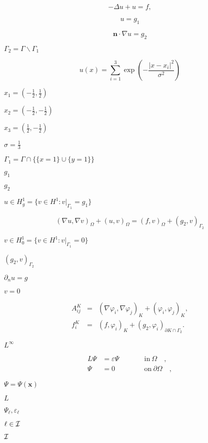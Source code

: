 \documentclass{article}
\begin{document}
\[ -\Delta u + u = f, \]
\pagebreak

\[ u = g_1 \]
\pagebreak

\[ {\mathbf n}\cdot \nabla u = g_2 \]
\pagebreak

$\Gamma_2 = \Gamma \backslash \Gamma_1$
\pagebreak

\[ u(x) = \sum_{i=1}^3 \exp\left(-\frac{|x-x_i|^2}{\sigma^2}\right) \]
\pagebreak

$x_1=(-\frac 12,\frac 12)$
\pagebreak

$x_2=(-\frac 12,-\frac 12)$
\pagebreak

$x_3=(\frac 12,-\frac 12)$
\pagebreak

$\sigma=\frac 13$
\pagebreak

$\Gamma_1=\Gamma \cap\{\{x=1\} \cup \{y=1\}\}$
\pagebreak

$g_1$
\pagebreak

$g_2$
\pagebreak

$u\in H^1_g=\{v\in H^1: v|_{\Gamma_1}=g_1\}$
\pagebreak

\[ {(\nabla u, \nabla v)}_\Omega + {(u,v)}_\Omega = {(f,v)}_\Omega + {(g_2,v)}_{\Gamma_2} \]
\pagebreak

$v\in H^1_0=\{v\in H^1: v|_{\Gamma_1}=0\}$
\pagebreak

${(g_2,v)}_{\Gamma_2}$
\pagebreak

$\partial_n u=g$
\pagebreak

$v=0$
\pagebreak

\begin{eqnarray*} A_{ij}^K &=& \left(\nabla \varphi_i, \nabla \varphi_j\right)_K +\left(\varphi_i, \varphi_j\right)_K, \\ f_i^K &=& \left(f,\varphi_i\right)_K +\left(g_2, \varphi_i\right)_{\partial K\cap \Gamma_2}. \end{eqnarray*}
\pagebreak

$L^\infty$
\pagebreak

\begin{align*} L \Psi &= \varepsilon \Psi \qquad &&\text{in}\ \Omega\quad, \\ \Psi &= 0 &&\text{on}\ \partial\Omega\quad, \end{align*}
\pagebreak

$\Psi=\Psi(\mathbf x)$
\pagebreak

$L$
\pagebreak

$\Psi_\ell,\varepsilon_\ell$
\pagebreak

$\ell\in {\cal I}$
\pagebreak

$\cal I$
\pagebreak
\end{document}
